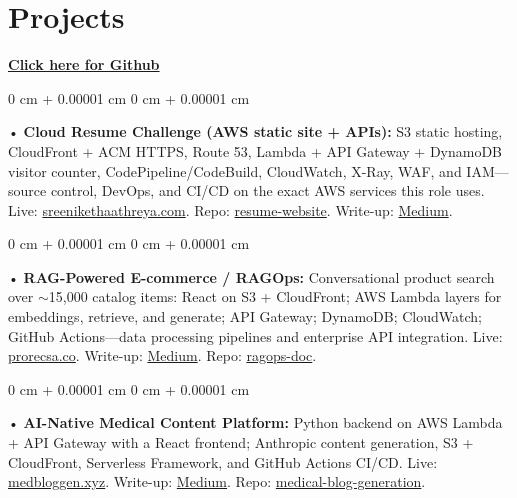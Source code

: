 \documentclass[10pt, letterpaper]{article}
\newenvironment{onecolentry}{
    \begin{adjustwidth}{
        0 cm + 0.00001 cm
    }{
        0 cm + 0.00001 cm
    }
}{
    \end{adjustwidth}
} %
\begin{document}
        \vspace{0.4cm}
\section{Projects}
    \vspace{2 pt}
\textbf{\href{https://github.com/daedalus-s}{Click here for Github}}
\begin{onecolentry}
     • \textbf{Cloud Resume Challenge (AWS static site + APIs):} S3 static hosting, CloudFront + ACM HTTPS, Route 53, Lambda + API Gateway + DynamoDB visitor counter, CodePipeline/CodeBuild, CloudWatch, X-Ray, WAF, and IAM---source control, DevOps, and CI/CD on the exact AWS services this role uses. Live: \href{https://sreenikethaathreya.com}{sreenikethaathreya.com}. Repo: \href{https://github.com/daedalus-s/resume-website}{resume-website}. Write-up: \href{https://medium.com/@sreenikethaathreya/cloud-resume-challenge-c4f17c3d53ff}{Medium}.
\end{onecolentry}
\begin{onecolentry}
     • \textbf{RAG-Powered E-commerce / RAGOps:} Conversational product search over $\sim$15,000 catalog items: React on S3 + CloudFront; AWS Lambda layers for embeddings, retrieve, and generate; API Gateway; DynamoDB; CloudWatch; GitHub Actions---data processing pipelines and enterprise API integration. Live: \href{https://prorecsa.co}{prorecsa.co}. Write-up: \href{https://medium.com/@sreenikethaathreya/from-rags-to-riches-bba8a671d5e6}{Medium}. Repo: \href{https://github.com/daedalus-s/ragops-doc}{ragops-doc}.
\end{onecolentry}
\begin{onecolentry}
     • \textbf{AI-Native Medical Content Platform:} Python backend on AWS Lambda + API Gateway with a React frontend; Anthropic content generation, S3 + CloudFront, Serverless Framework, and GitHub Actions CI/CD. Live: \href{https://medbloggen.xyz}{medbloggen.xyz}. Write-up: \href{https://medium.com/@sreenikethaathreya/medical-blog-writing-using-genai-0b7e78b6032f}{Medium}. Repo: \href{https://github.com/daedalus-s/medical-blog-generation}{medical-blog-generation}.
\end{onecolentry}
\vspace{2 pt}
        \vspace{2 pt }
\end{document}
